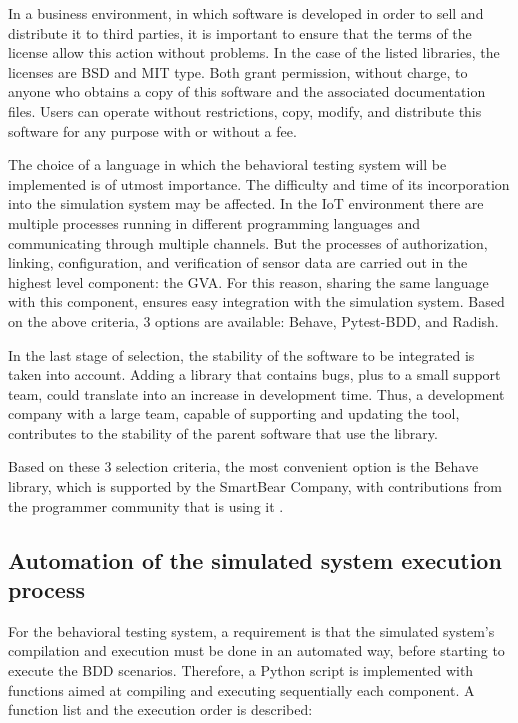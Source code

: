 \documentclass[journal]{IEEEtran}	%
\begin{document}
In a business environment, in which software is developed in order to sell and distribute it to third parties, it is important to ensure that the terms of the license allow this action without problems. In the case of the listed libraries, the licenses are BSD and MIT type. Both grant permission, without charge, to anyone who obtains a copy of this software and the associated documentation files. Users can operate without restrictions, copy, modify, and distribute this software for any purpose with or without a fee.

The choice of a language in which the behavioral testing system will be implemented is of utmost importance. The difficulty and time of its incorporation into the simulation system may be affected. In the IoT environment there are multiple processes running in different programming languages and communicating through multiple channels. But the processes of authorization, linking, configuration, and verification of sensor data are carried out in the highest level component: the GVA. For this reason, sharing the same language with this component, ensures easy integration with the simulation system. Based on the above criteria, 3 options are available: Behave, Pytest-BDD, and Radish.

In the last stage of selection, the stability of the software to be integrated is taken into account. Adding a library that contains bugs, plus to a small support team, could translate into an increase in development time. Thus, a development company with a large team, capable of supporting and updating the tool, contributes to the stability of the parent software that use the library.

Based on these 3 selection criteria, the most convenient option is the Behave library, which is supported by the SmartBear Company, with contributions from the programmer community that is using it \cite{behave2021github}.


\subsection{Automation of the simulated system execution process}


For the behavioral testing system, a requirement is that the simulated system's compilation and execution must be done in an automated way, before starting to execute the BDD scenarios. Therefore, a Python script is implemented with functions aimed at compiling and executing sequentially each component. A function list and the execution order is described:
\end{document}
